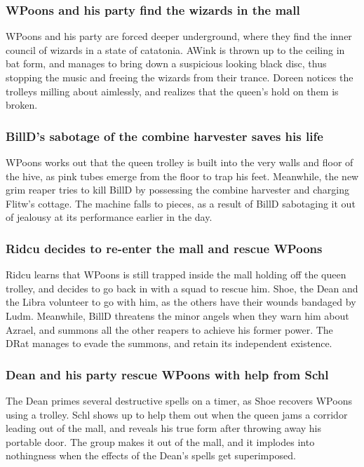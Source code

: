 \subsubsection{\Gls{WPoons} and his party find the wizards in the mall}
\Gls{WPoons} and his party are forced deeper underground, where they find the inner council of
wizards in a state of catatonia. \Gls{AWink} is thrown up to the ceiling in bat form, and manages
to bring down a suspicious looking black disc, thus stopping the music and freeing the wizards
from their trance. \Gls{Doreen} notices the trolleys milling about aimlessly, and realizes that the
queen's hold on them is broken.

\subsubsection{\Gls{BillD}'s sabotage of the combine harvester saves his life}
\Gls{WPoons} works out that the queen trolley is built into the very walls and floor of the hive,
as pink tubes emerge from the floor to trap his feet. Meanwhile, the new grim reaper tries to
kill \Gls{BillD} by possessing the combine harvester and charging \Gls{Flitw}'s cottage. The
machine falls to pieces, as a result of \Gls{BillD} sabotaging it out of jealousy at its performance
earlier in the day.

\subsubsection{\Gls{Ridcu} decides to re-enter the mall and rescue \Gls{WPoons}}
\Gls{Ridcu} learns that \Gls{WPoons} is still trapped inside the mall holding off the queen trolley,
and decides to go back in with a squad to rescue him. \Gls{Shoe}, the \Gls{Dean} and the \Gls{Libra}
volunteer to go with him, as the others have their wounds bandaged by \Gls{Ludm}. Meanwhile,
\Gls{BillD} threatens the minor angels when they warn him about \Gls{Azrael}, and summons all the
other reapers to achieve his former power. The \Gls{DRat} manages to evade the summons, and retain
its independent existence.

\subsubsection{\Gls{Dean} and his party rescue \Gls{WPoons} with help from \Gls{Schl}}
The \Gls{Dean} primes several destructive spells on a timer, as \Gls{Shoe} recovers \Gls{WPoons}
using a trolley. \Gls{Schl} shows up to help them out when the queen jams a corridor leading out
of the mall, and reveals his true form after throwing away his portable door. The group makes it
out of the mall, and it implodes into nothingness when the effects of the \Gls{Dean}'s spells get
superimposed.

